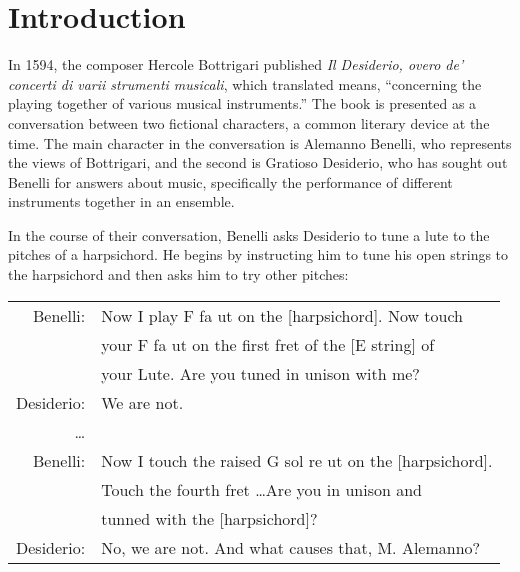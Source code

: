 \chapter*{Introduction}

In 1594, the composer Hercole Bottrigari published 
\textit{Il Desiderio, overo de' concerti di varii strumenti musicali}, which 
translated means, ``concerning the playing together of various musical instruments.''
The book is presented as a conversation between two fictional characters, a common 
literary device at the time.  The main character in the conversation is
Alemanno Benelli, who represents the views of Bottrigari, and the second
is Gratioso Desiderio, who has sought out Benelli for answers about music,
specifically the performance of different instruments together in an ensemble.

In the course of their conversation, Benelli asks Desiderio to tune a lute to
the pitches of a harpsichord.  He begins by instructing him to tune his open
strings to the harpsichord and then asks him to try other pitches:

\begin{blocks}
\begin{center}
\begin{tabular}{r l}
Benelli:   & Now I play F fa ut on the [harpsichord]. Now touch                      \\
           & your F fa ut on the first fret of the [E string] of                     \\
           & your Lute. Are you tuned in unison with me?                             \\
Desiderio: & We are not.                                                             \\
\ldots     &                                                                         \\
Benelli:   & Now I touch the raised G sol re ut on the [harpsichord].                \\ 
           & Touch the fourth fret \ldots Are you in unison and                      \\
           & tunned with the [harpsichord]?                                          \\
Desiderio: & No, we are not. And what causes that, M. Alemanno? \autocite[18]{HB:1}  \\
\end{tabular}
\end{center}
\end{blocks}

